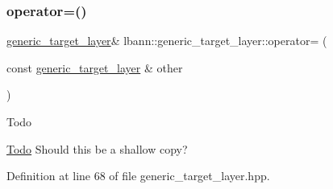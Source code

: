 \subsubsection{\texorpdfstring{operator=()}{operator=()}}
{\footnotesize\ttfamily \hyperlink{classlbann_1_1generic__target__layer}{generic\+\_\+target\+\_\+layer}\& lbann\+::generic\+\_\+target\+\_\+layer\+::operator= (\begin{DoxyParamCaption}\item[{const \hyperlink{classlbann_1_1generic__target__layer}{generic\+\_\+target\+\_\+layer} \&}]{other }\end{DoxyParamCaption})\hspace{0.3cm}{\ttfamily [inline]}}

\begin{DoxyRefDesc}{Todo}
\item[\hyperlink{todo__todo000022}{Todo}]Should this be a shallow copy? \end{DoxyRefDesc}


Definition at line 68 of file generic\+\_\+target\+\_\+layer.\+hpp.


